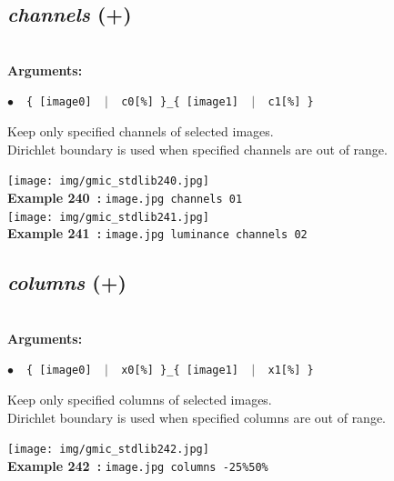\documentclass[a4paper,10.5pt,twoside]{book}
\def\comma{\discretionary{,}{}{,}}
\newcommand{\Cb}[1]{\textcolor{cb}{#1}}
\begin{document}
\subsection{\emph{channels} (+)}\vspace*{-0.7em}
~\\\textbf{\Cb{Arguments: }}\begin{flushleft}
{\small \Cb{\hspace*{0.5cm}$\bullet$~~\texttt{\{ [image0] ~$|$~ c0[\%] \}{\comma}\_\{ [image1] ~$|$~ c1[\%] \}}}}\end{flushleft}
Keep only specified channels of selected images.
~\\Dirichlet boundary is used when specified channels are out of range.
\begin{center}\texttt{[image: img/gmic\_stdlib240.jpg]}\\
{\footnotesize \textbf{Example 240~:} \texttt{image.jpg channels 0{\comma}1}}
\\\texttt{[image: img/gmic\_stdlib241.jpg]}\\
{\footnotesize \textbf{Example 241~:} \texttt{image.jpg luminance channels 0{\comma}2}}
\end{center}

\subsection{\emph{columns} (+)}\vspace*{-0.7em}
~\\\textbf{\Cb{Arguments: }}\begin{flushleft}
{\small \Cb{\hspace*{0.5cm}$\bullet$~~\texttt{\{ [image0] ~$|$~ x0[\%] \}{\comma}\_\{ [image1] ~$|$~ x1[\%] \}}}}\end{flushleft}
Keep only specified columns of selected images.
~\\Dirichlet boundary is used when specified columns are out of range.
\begin{center}\texttt{[image: img/gmic\_stdlib242.jpg]}\\
{\footnotesize \textbf{Example 242~:} \texttt{image.jpg columns -25\%{\comma}50\%}}
\end{center}
\end{document}
